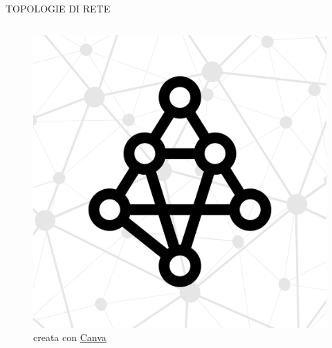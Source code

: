 \documentclass[aspectratio=1610,handout]{beamer}
\begin{document}
\begin{frame}{TOPOLOGIE DI RETE}
\begin{columns}
\begin{figure}
                \includegraphics[width=\linewidth]{img/maglia.png}
                \caption{{creata con \href{https://www.canva.com/}{Canva}}}
            \end{figure}
    \end{columns}
\end{frame}
\end{document}

